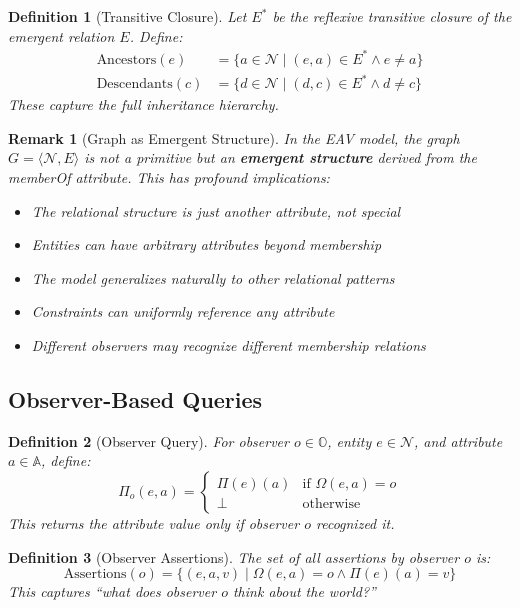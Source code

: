 \documentclass[11pt]{article}
\newtheorem{definition}{Definition}
\newtheorem{remark}{Remark}
\begin{document}
\begin{definition}[Transitive Closure]
Let $E^*$ be the reflexive transitive closure of the emergent relation $E$. Define:
\begin{align}
\text{Ancestors}(e) &= \{ a \in \mathcal{N} \mid (e, a) \in E^* \land e \neq a \} \\
\text{Descendants}(c) &= \{ d \in \mathcal{N} \mid (d, c) \in E^* \land d \neq c \}
\end{align}
These capture the full inheritance hierarchy.
\end{definition}

\begin{remark}[Graph as Emergent Structure]
In the EAV model, the graph $G = \langle \mathcal{N}, E \rangle$ is not a primitive but an \textbf{emergent structure} derived from the memberOf attribute. This has profound implications:
\begin{itemize}
\item The relational structure is just another attribute, not special
\item Entities can have arbitrary attributes beyond membership
\item The model generalizes naturally to other relational patterns
\item Constraints can uniformly reference any attribute
\item Different observers may recognize different membership relations
\end{itemize}
\end{remark}

\subsection{Observer-Based Queries}

\begin{definition}[Observer Query]
For observer $o \in \mathbb{O}$, entity $e \in \mathcal{N}$, and attribute $a \in \mathbb{A}$, define:
\[
\Pi_o(e, a) = \begin{cases} \Pi(e)(a) & \text{if } \Omega(e, a) = o \\ \bot & \text{otherwise} \end{cases}
\]
This returns the attribute value \emph{only if} observer $o$ recognized it.
\end{definition}

\begin{definition}[Observer Assertions]
The set of all assertions by observer $o$ is:
\[
\text{Assertions}(o) = \{ (e, a, v) \mid \Omega(e, a) = o \land \Pi(e)(a) = v \}
\]
This captures ``what does observer $o$ think about the world?''
\end{definition}
\end{document}
